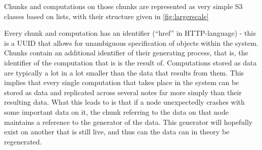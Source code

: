 Chunks and computations on those chunks are represented as very simple S3 classes based on lists, with their structure given in \cref{fig:largerscale}


Every chunk and computation has an identifier (``href'' in HTTP-language) - this is a UUID that allows for unambiguous specification of objects within the system.
Chunks contain an additional identifier of their generating process, that is, the identifier of the computation that is is the result of.
Computations stored as data are typically a lot in a lot smaller than the data that results from them.
This implies that every single computation that takes place in the system can be stored as data and replicated across several notes far more simply than their resulting data.
What this leads to is that if a node unexpectedly crashes with some important data on it, the chunk referring to the data on that node maintains a reference to the generator of the data.
This generator will hopefully exist on another that is still live, and thus can the data can in theory be regenerated.
